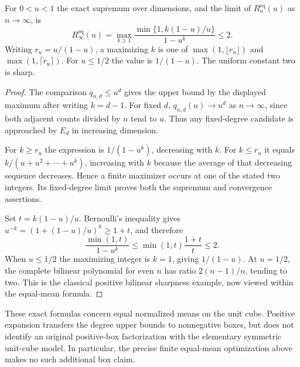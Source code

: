 \begin{corollary}\label{cor:equal-infinite}
For $0<u<1$ the exact supremum over dimensions, and the limit of
$R_n^{\mathrm{eq}}(u)$ as $n\to\infty$, is
\begin{equation}\label{eq:equal-infinite}
 R_\infty^{\mathrm{eq}}(u)
 =\max_{k\ge1}\frac{\min\{1,k(1-u)/u\}}{1-u^k}\le2.
\end{equation}
Writing $r_u=u/(1-u)$, a maximizing $k$ is one of
$\max(1,\lfloor r_u\rfloor)$ and $\max(1,\lceil r_u\rceil)$.
For $u\le1/2$ the value is $1/(1-u)$. The uniform constant two is sharp.
\end{corollary}
\begin{proof}
The comparison $q_{n,d}\le u^d$ gives the upper bound by the displayed
maximum after writing $k=d-1$. For fixed $d$,
$q_{n,d}(u)\to u^d$ as $n\to\infty$, since both adjacent counts divided
by $n$ tend to $u$. Thus any fixed-degree candidate is approached by
$E_d$ in increasing dimension.

For $k\ge r_u$ the expression is $1/(1-u^k)$, decreasing with $k$.
For $k\le r_u$ it equals $k/(u+u^2+\cdots+u^k)$, increasing with $k$
because the average of that decreasing sequence decreases. Hence a finite
maximizer occurs at one of the stated two integers. Its fixed-degree
limit proves both the supremum and convergence assertions.

Set $t=k(1-u)/u$. Bernoulli's inequality gives
$u^{-k}=(1+(1-u)/u)^k\ge1+t$, and therefore
\[
 \frac{\min(1,t)}{1-u^k}\le\min(1,t)\frac{1+t}{t}\le2.
\]
When $u\le1/2$ the maximizing integer is $k=1$, giving $1/(1-u)$.
At $u=1/2$, the complete bilinear polynomial for even $n$ has ratio
$2(n-1)/n$, tending to two. This is the classical positive bilinear
sharpness example, now viewed within the equal-mean formula.
\end{proof}

These exact formulas concern equal normalized means on the unit cube.
Positive expansion transfers the degree upper bounds to nonnegative
boxes, but does not identify an original positive-box factorization with
the elementary symmetric unit-cube model. In particular, the precise
finite equal-mean optimization above makes no such additional box claim.
